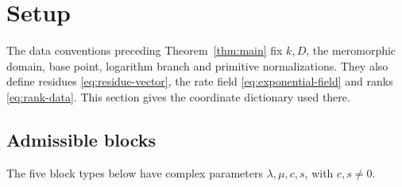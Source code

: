 \section{Setup}\label{sec:setup}
The data conventions preceding Theorem~\ref{thm:main} fix $k,D$,
the meromorphic domain, base point, logarithm branch and primitive
normalizations. They also define residues \eqref{eq:residue-vector},
the rate field \eqref{eq:exponential-field} and ranks \eqref{eq:rank-data}.
This section gives the coordinate dictionary used there.

\subsection{Admissible blocks}\label{subsec:blocks}
The five block types below have complex parameters $\lambda,\mu,c,s$,
with $c,s\ne0$.
